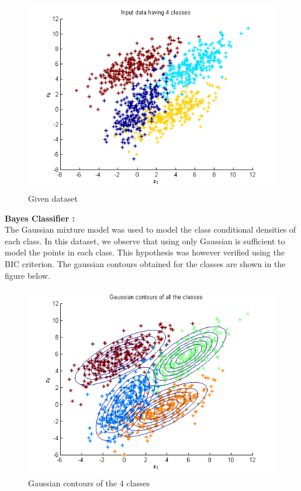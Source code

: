 \documentclass{article}
\begin{document}
\begin{figure}[H]
\centering
\includegraphics[width=\linewidth]{Classification/overlapping/input_data.png}
\caption{Given dataset}
\end{figure}


\begin{flushleft}

\textbf{Bayes Classifier :} \\[10pt]


The Gaussian mixture model was used to model the class conditional densities of each class. In this dataset, we observe that using only Gaussian is sufficient to model the points in each class. This hypothesis was however verified using the BIC criterion. The gaussian contours obtained for the classes are shown in the figure below.


\end{flushleft}

\begin{figure}[H]
\centering
\includegraphics[width=\linewidth]{Classification/overlapping/gmm.png}
\caption{Gaussian contours of the 4 classes}
\end{figure}
\end{document}
